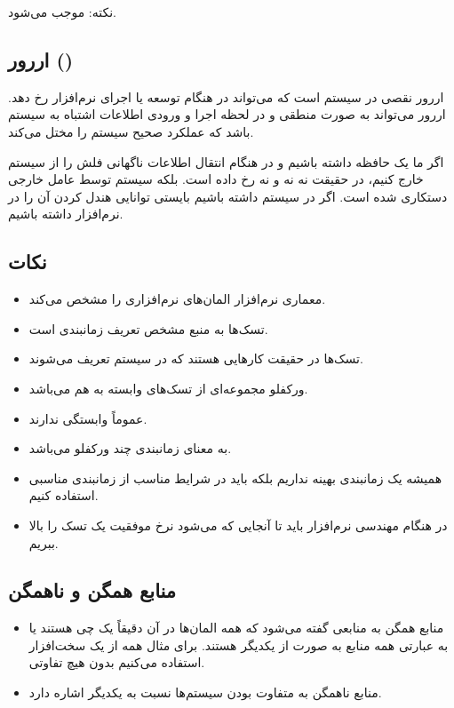 نکته:  موجب  می‌شود.

\subsection{اررور ()}

اررور نقصی در سیستم است که می‌تواند در هنگام توسعه یا اجرای نرم‌افزار رخ دهد.
اررور می‌تواند به صورت منطقی و در لحظه اجرا و ورودی اطلاعات اشتباه به سیستم باشد
که عملکرد صحیح سیستم را مختل می‌کند.

اگر ما یک حافظه  داشته باشیم و در هنگام انتقال اطلاعات ناگهانی فلش را از
سیستم خارج کنیم، در حقیقت نه  نه  و نه  رخ داده
است. بلکه سیستم توسط عامل خارجی دستکاری شده است. اگر  در سیستم داشته
باشیم بایستی توانایی هندل کردن آن را در نرم‌افزار داشته باشیم.

\subsection*{نکات}

\begin{itemize}
    \item معماری نرم‌افزار المان‌های نرم‌افزاری را مشخص می‌کند.
    \item {} تسک‌ها به منبع مشخص تعریف زمانبندی است.
    \item تسک‌ها در حقیقت کار‌هایی هستند که در سیستم تعریف می‌شوند.
    \item ورکفلو مجموعه‌ای از تسک‌های وابسته به هم می‌باشد.
    \item {} عموماً وابستگی ندارند.
    \item {} به معنای زمانبندی چند ورکفلو
    می‌باشد.
    \item همیشه یک زمانبندی بهینه نداریم بلکه باید در شرایط مناسب از زمانبندی
    مناسبی استفاده کنیم.
    \item در هنگام مهندسی نرم‌افزار باید تا آنجایی که می‌شود نرخ موفقیت یک تسک
    را بالا ببریم.
\end{itemize}

\subsection{منابع همگن و ناهمگن}

\begin{itemize}
    \item منابع همگن به منابعی گفته می‌شود که همه المان‌ها در آن دقیقاً یک چی
    هستند یا به عبارتی همه منابع به صورت  از یکدیگر هستند. برای مثال
    همه از یک سخت‌افزار استفاده می‌کنیم بدون هیچ تفاوتی.
    \item منابع ناهمگن به متفاوت بودن سیستم‌ها نسبت به یکدیگر اشاره دارد.
\end{itemize}

